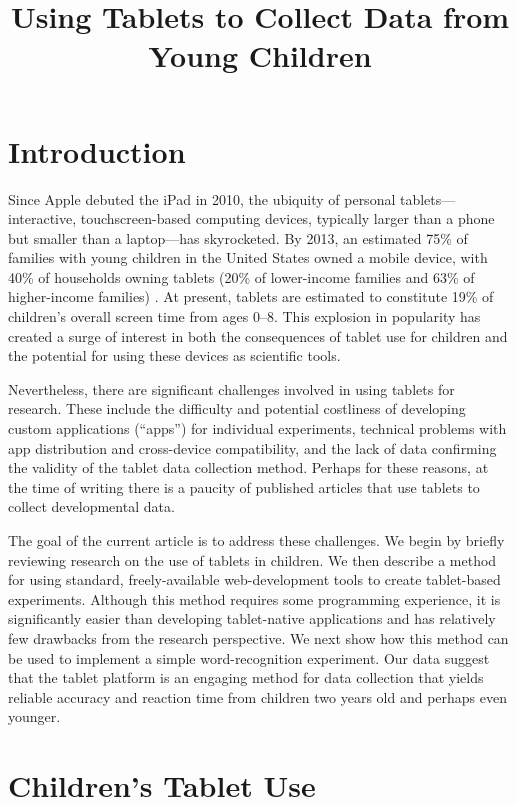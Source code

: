 \documentclass[man,noapacite]{apa2}
\title{Using Tablets to Collect Data from Young Children}
\begin{document}
\maketitle


\section{Introduction}

Since Apple debuted the iPad in 2010, the ubiquity of personal tablets---interactive, touchscreen-based computing devices, typically larger than a phone but smaller than a laptop---has skyrocketed. By 2013, an estimated 75\% of families with young children in the United States owned a mobile device, with 40\% of households owning tablets (20\% of lower-income families and 63\% of higher-income families) \cite{rideout2013}. At present, tablets are estimated to constitute 19\% of children’s overall screen time from ages 0--8. This explosion in popularity has created a surge of interest in both the consequences of tablet use for children and the potential for using these devices as scientific tools. 

Nevertheless, there are significant challenges involved in using tablets for research. These include the difficulty and potential costliness of developing custom applications (``apps'') for individual experiments, technical problems with app distribution and cross-device compatibility, and the lack of data confirming the validity of the tablet data collection method. Perhaps for these reasons, at the time of writing there is a paucity of published articles that use tablets to collect developmental data. 

The goal of the current article is to address these challenges. We begin by briefly reviewing research on the use of tablets in children. We then describe a method for using standard, freely-available web-development tools to create tablet-based experiments. Although this method requires some programming experience, it is significantly easier than developing tablet-native applications and has relatively few drawbacks from the research perspective. We next show how this method can be used to implement a simple word-recognition experiment. Our data suggest that the tablet platform is an engaging method for data collection that yields reliable accuracy and reaction time from children two years old and perhaps even younger. 

\section{Children's Tablet Use}
\end{document}

